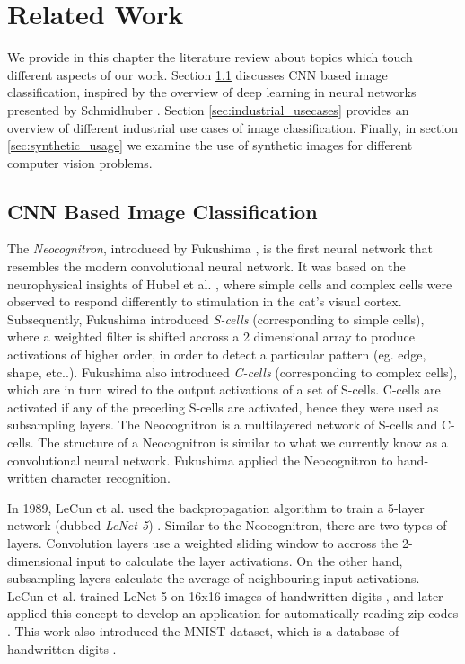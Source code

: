 \chapter{Related Work}\label{ch:related_work}

We provide in this chapter the literature review about topics which touch different aspects of our work. Section \ref{sec:cnn_based_image_classification} discusses CNN based image classification, inspired by the overview of deep learning in neural networks presented by Schmidhuber \cite{schmidhuber2015deep}. Section \ref{sec:industrial_usecases} provides an overview of different industrial use cases of image classification. Finally, in section \ref{sec:synthetic_usage} we examine the use of synthetic images for different computer vision problems.


\section{CNN Based Image Classification}\label{sec:cnn_based_image_classification}

The \textit{Neocognitron}, introduced by Fukushima \cite{fukushima1980neocognitron}, is the first neural network that resembles the modern convolutional neural network. It was based on the neurophysical insights of Hubel et al. \cite{hubel1959receptive} \cite{hubel1962receptive}, where simple cells and complex cells were observed to respond differently to stimulation in the cat’s visual cortex. Subsequently, Fukushima introduced \textit{S-cells} (corresponding to simple cells), where a weighted filter is shifted accross a 2 dimensional array to produce activations of higher order, in order to detect a particular pattern (eg. edge, shape, etc..). Fukushima also introduced \textit{C-cells} (corresponding to complex cells), which are in turn wired to the output activations of a set of S-cells. C-cells are activated if any of the preceding S-cells are activated, hence they were used as subsampling layers. The Neocognitron is a multilayered network of S-cells and C-cells. The structure of a Neocognitron is similar to what we currently know as a convolutional neural network. Fukushima applied the Neocognitron to hand-written character recognition.

In 1989, LeCun et al. used the backpropagation algorithm to train a 5-layer network (dubbed \textit{LeNet-5}) \cite{lecun1989generalization} \cite{lecun1998gradient}. Similar to the Neocognitron, there are two types of layers. Convolution layers use a weighted sliding window to accross the 2-dimensional input to calculate the layer activations. On the other hand, subsampling layers calculate the average of neighbouring input activations. LeCun et al. trained LeNet-5 on 16x16 images of handwritten digits \cite{lecun1990handwritten}, and later applied this concept to develop an application for automatically reading zip codes \cite{lecun1989backpropagation}. This work also introduced the MNIST dataset, which is a database of handwritten digits \cite{lecun1998mnist}.

